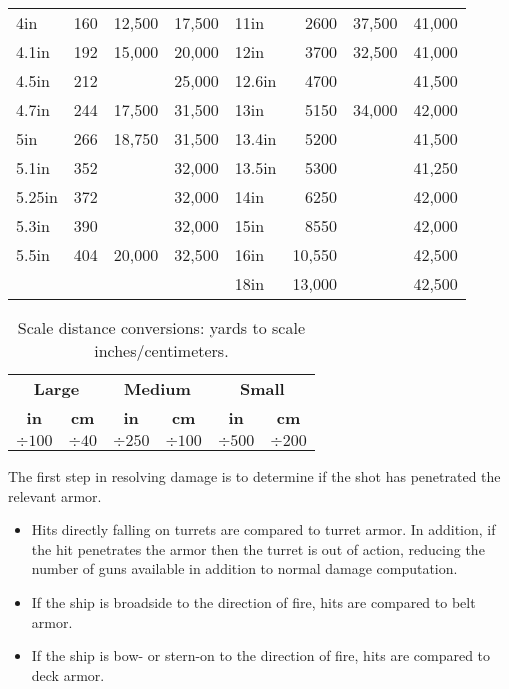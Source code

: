 \documentclass[twocolumn]{article}
\begin{document}
\begin{table*}
\begin{minipage}{6in}
\begin{tabular}{lrrr|lrrr}
  4in          &    160 & 12,500 & 17,500       &  11in         &   2600 & 37,500    & 41,000       \\
  4.1in        &    192 & 15,000 & 20,000       &  12in         &   3700 & 32,500    & 41,000       \\
  4.5in        &    212 &        & 25,000       &  12.6in       &   4700 &           & 41,500       \\
  4.7in        &    244 & 17,500 & 31,500       &  13in         &   5150 & 34,000    & 42,000       \\
  5in          &    266 & 18,750 & 31,500       &  13.4in       &   5200 &           & 41,500       \\
  5.1in        &    352 &        & 32,000       &  13.5in       &   5300 &           & 41,250       \\
  5.25in       &    372 &        & 32,000       &  14in         &   6250 &           & 42,000       \\
  5.3in        &    390 &        & 32,000       &  15in         &   8550 &           & 42,000       \\
  5.5in        &    404 & 20,000 & 32,500       &  16in         & 10,550 &           & 42,500       \\
               &        &        &              &  18in         & 13,000 &           & 42,500  
  \end{tabular}
  \end{minipage}
\end{table*}

\begin{table*}
  \caption{Scale distance conversions: yards to scale inches/centimeters.}
  \label{scaledistanceconversions}
  \centering
  \begin{tabular}{cc|cc|cc}
  \multicolumn{2}{c}{\textbf{Large}} & \multicolumn{2}{c}{\textbf{Medium}} & \multicolumn{2}{c}{\textbf{Small}} \\
  \textbf{in} & \textbf{cm} & \textbf{in} & \textbf{cm} & \textbf{in} & \textbf{cm} \\
  $\div 100$  & $\div 40$   & $\div 250$  & $\div 100$   & $\div 500$   & $\div 200$ 
  \end{tabular}
\end{table*}

The first step in resolving damage is to determine if the shot has penetrated the relevant armor.
\begin{itemize}
\item Hits directly falling on turrets are compared to turret armor.
In addition, if the hit penetrates the armor then the turret is out of
action, reducing the number of guns available in addition to normal
damage computation.
\item If the ship is broadside to the direction of fire, hits are
compared to belt armor.
\item If the ship is bow- or stern-on to the direction of fire, hits are
compared to deck armor.
\end{itemize}
\end{document}
